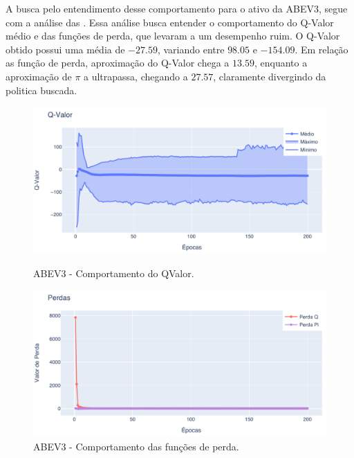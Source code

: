 A busca pelo entendimento desse comportamento para o ativo da ABEV3, segue com a análise das . Essa análise busca entender o comportamento do Q-Valor médio e das funções de perda, que levaram a um desempenho ruim. O Q-Valor obtido possui uma média de $-27.59$, variando entre $98.05$ e $-154.09$. Em relação as função de perda, aproximação do Q-Valor chega a $13.59$, enquanto a aproximação de $\pi$ a ultrapassa, chegando a $27.57$, claramente divergindo da politica buscada.

\begin{figure}[htbp]
    \centering 
    \begin{minipage}[b]{0.45\linewidth}
        \includegraphics[width=\linewidth]{img/ddpg/abev3/clean/qval}
        \caption{ABEV3 - Comportamento do QValor.} 
        \label{abev_clean_qval}
    \end{minipage}
    \quad
    \begin{minipage}[b]{0.45\linewidth}
        \includegraphics[width=\linewidth]{img/ddpg/abev3/clean/loss}
        \caption{ABEV3 - Comportamento das funções de perda.}
        \label{abev_clean_loss}
    \end{minipage}
\end{figure}

